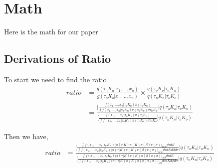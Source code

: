 \documentclass[submit]{smj}
\begin{document}
\maketitle


\section{Math}
Here is the math for our paper

\subsection{Derivations of Ratio}


To start we need to find the ratio \\ 
\begin{align*}
ratio &= \frac{g(\tau_{n} K_{n} | x_1,\dots,x_n) }{g(\tau_{o} K_{o} | x_1,\dots,x_n)} \times \frac{q(\tau_{o} K_{o} | \tau_{n} K_{n})}{q(\tau_{n} K_{n}| \tau_{o} K_{o})} \\
&= \frac{\Big[ \frac{f(x_1,\dots,x_n | \tau_{n} K_{n}) \pi(\tau_{n} K_{n})}{\int f(x_1, \dots ,x_n | \tau_{n} K_{n}) \pi(\tau_{n} K_{n}) d \tau_{n} K_{n} } \Big] q(\tau_{o} K_{o} | \tau_{n} K_{n})}{\Big[ \frac{f(x_1,\dots,x_n | \tau_{o} K_{o}) \pi(\tau_{o} K_{o})}{\int f(x_1, \dots ,x_n | \tau_{o} K_{o}) \pi(\tau_{o} K_{o}) d \tau_{o} K_{o} }\Big] q(\tau_{n} K_{n}| \tau_{o} K_{o})} 
\end{align*}

Then we have,
\begin{align*}
ratio &= \frac{\Big[ \frac{ \int f(x_1,\dots,x_n | \tau_{n} K_{n}) \big(\pi(\tau|K)\pi(K)\pi(\beta)\pi(\sigma)\big)_{new} d\tau dK }{\int f(x_1, \dots ,x_n | \tau_{n} K_{n}) \big(\pi(\tau|K)\pi(K)\pi(\beta)\pi(\sigma)\big)_{new} d\tau dK d \beta d\sigma } \Big] q(\tau_{o} K_{o} | \tau_{n} K_{n})}{\Big[ \frac{ \int f(x_1,\dots,x_n | \tau_{o} K_{o}) \big(\pi(\tau|K)\pi(K)\pi(\beta)\pi(\sigma)\big)_{old} d\tau dK}{\int f(x_1, \dots ,x_n | \tau_{o} K_{o}) \big(\pi(\tau|K)\pi(K)\pi(\beta)\pi(\sigma)\big)_{old} d \tau dK d \beta d\sigma }\Big] q(\tau_{n} K_{n}| \tau_{o} K_{o})} 
\end{align*}
\end{document}
